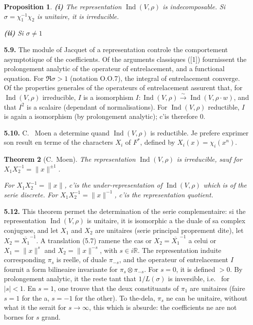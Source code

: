 \documentclass[12pt,a4paper]{article}
\theoremstyle{plain}
\newtheorem{theorem}{Theorem}[section]
\newtheorem{proposition}[theorem]{Proposition}
\theoremstyle{definition}
\theoremstyle{remark}
\DeclareMathOperator{\Ind}{Ind}
\newcommand{\RR}{\mathbb{R}}
\newcommand{\ov}[1]{\overline{#1}}
\providecommand{\RR}{\mathbb{R}}
\begin{document}
\begin{proposition}\label{prop:5.8}
\textbf{(i)} The representation $\Ind(V, \rho)$ is indecomposable. Si $\sigma = \chi_1^{-1} \chi_2$ is unitaire, it is irreducible.

\textbf{(ii)} Si $\sigma \neq 1$
\end{proposition}

\textbf{5.9.} The module of Jacquet of a representation controle the comportement asymptotique of the coefficients. Of the arguments classiques ([1]) fournissent the prolongement analytic of the operateur of entrelacement, and a functional equation. For $\Re \sigma > 1$ (notation O.O.7), the integral of entrelacement converge. Of the properties generales of the operateurs of entrelacement assurent that, for $\Ind(V, \rho)$ irreducible, $I$ is a isomorphism $I : \Ind(V, \rho) \xrightarrow{\sim} \Ind(V, \rho \cdot w)$, and that $I^2$ is a scalaire (dependant of normalisations). For $\Ind(V, \rho)$ reductible, $I$ is again a isomorphism (by prolongement analytic); c'is therefore $0$.

\textbf{5.10.} C.
\ Moen a determine quand $\Ind(V, \rho)$ is reductible. Je prefere exprimer son result en terme of the characters $X_i$ of $F^*$, defined by $X_i(x) = \chi_i(x^n)$.

\begin{theorem}[C.\ Moen]\label{thm:5.11}
The representation $\Ind(V, \rho)$ is irreducible, sauf for $X_1 X_2^{-1} = \|x\|^{\pm 1}$.

For $X_1 X_2^{-1} = \|x\|$, c'is the under-representation of $\Ind(V, \rho)$ which is of the serie discrete. For $X_1 X_2^{-1} = \|x\|^{-1}$, c'is the representation quotient.
\end{theorem}

\textbf{5.12.} This theorem permet the determination of the serie complementaire: si the representation $\Ind(V, \rho)$ is unitaire, it is isomorphic a the duale of sa complex conjuguee, and let $X_1$ and $X_2$ are unitaires (serie principal proprement dite), let $X_2 = \ov{X_1}^{-1}$. A translation (5.7) ramene the cas or $X_2 = \ov{X_1}^{-1}$ a celui or $X_1 = \|x\|^s$ and $X_2 = \|x\|^{-s}$, with $s \in i\RR$. The representation induite corresponding $\pi_s$ is reelle, of duale $\pi_{-s}$, and the operateur of entrelacement $I$ fournit a form bilineaire invariante for $\pi_s \otimes \pi_{-s}$. For $s = 0$, it is defined $> 0$. By prolongement analytic, it the reste tant that $1/L(\sigma)$ is inversible, i.e.
\ for $|s| < 1$. En $s = 1$, one trouve that the deux constituants of $\pi_1$ are unitaires (faire $s = 1$ for the a, $s = -1$ for the other). To the-dela, $\pi_s$ ne can be unitaire, without what it the serait for $s \to \infty$, this which is absurde: the coefficients ne are not bornes for $s$ grand.
\end{document}
